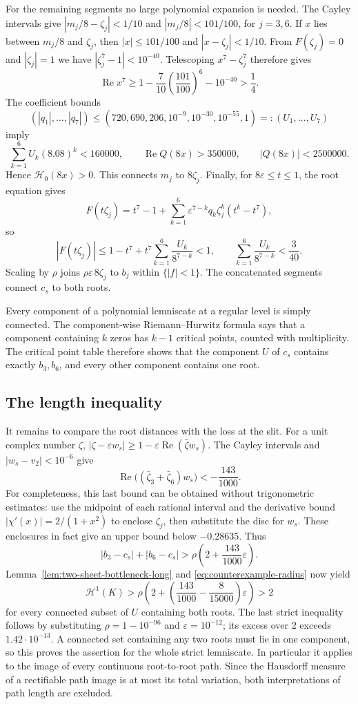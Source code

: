 For the remaining segments no large polynomial expansion is needed.
The Cayley intervals give
$|m_j/8-\zeta_j|<1/10$ and $|m_j/8|<101/100$, for $j=3,6$.
If $x$ lies between $m_j/8$ and $\zeta_j$, then
$|x|\le101/100$ and $|x-\zeta_j|<1/10$.
From $F(\zeta_j)=0$ and $|\zeta_j|=1$ we have
$|\zeta_j^7-1|<10^{-40}$. Telescoping $x^7-\zeta_j^7$ therefore gives
\[
 \operatorname{Re}x^7
 \ge1-\frac7{10}\left(\frac{101}{100}\right)^6-10^{-40}>\frac14.
\]
The coefficient bounds
\[
 (|q_1|,\ldots,|q_7|)
 \le(720,690,206,10^{-9},10^{-30},10^{-55},1)=:(U_1,\ldots,U_7)
\]
imply
\[
 \sum_{k=1}^6U_k(8.08)^k<160000,\qquad
 \operatorname{Re}Q(8x)>350000,\qquad |Q(8x)|<2500000.
\]
Hence $\mathscr H_0(8x)>0$. This connects $m_j$ to $8\zeta_j$.
Finally, for $8\varepsilon\le t\le1$, the root equation gives
\[
 F(t\zeta_j)=t^7-1+
       \sum_{k=1}^6\varepsilon^{7-k}q_k\zeta_j^k(t^k-t^7),
\]
so
\[
 |F(t\zeta_j)|\le1-t^7+t^7\sum_{k=1}^6\frac{U_k}{8^{7-k}}<1,
 \qquad \sum_{k=1}^6\frac{U_k}{8^{7-k}}<\frac{3}{40}.
\]
Scaling by $\rho$ joins $\rho\varepsilon\,8\zeta_j$ to $b_j$ within
$\{|f|<1\}$. The concatenated segments connect $c_s$ to both roots.

Every component of a polynomial lemniscate at a regular level is simply
connected. The component-wise Riemann--Hurwitz formula
\cite[proof of Proposition~2.1]{eks2010} says that a component containing
$k$ zeros has $k-1$ critical points, counted with multiplicity. The critical
point table therefore shows that the component $U$ of $c_s$ contains
exactly $b_3,b_6$, and every other component contains one root.

\subsection{The length inequality}\label{subsec:counterexample-length}

It remains to compare the root distances with the loss at the slit.
For a unit complex number $\zeta$,
$|\zeta-\varepsilon w_s|\ge1-\varepsilon\operatorname{Re}(\bar\zeta w_s)$.
The Cayley intervals and $|w_s-v_2|<10^{-6}$ give
\[
 \operatorname{Re}\bigl((\bar\zeta_3+\bar\zeta_6)w_s\bigr)
 <-\frac{143}{1000}.
\]
For completeness, this last bound can be obtained without trigonometric
estimates: use the midpoint of each rational interval and the derivative
bound $|\chi'(x)|=2/(1+x^2)$ to enclose $\zeta_j$, then substitute the
disc for $w_s$. These enclosures in fact give an upper bound below
$-0.28635$. Thus
\[
 |b_3-c_s|+|b_6-c_s|>\rho\left(2+\frac{143}{1000}\varepsilon\right).
\]
Lemma~\ref{lem:two-sheet-bottleneck-long} and
\eqref{eq:counterexample-radius} now yield
\[
 \mathcal H^1(K)>
 \rho\left(2+\left(\frac{143}{1000}-\frac8{15000}\right)
                     \varepsilon\right)>2
\]
for every connected subset of $U$ containing both roots. The last strict
inequality follows by substituting $\rho=1-10^{-96}$ and
$\varepsilon=10^{-12}$; its excess over $2$ exceeds $1.42\cdot10^{-13}$.
A connected set containing any two roots must lie in one component, so
this proves the assertion for the whole strict lemniscate. In particular
it applies to the image of every continuous root-to-root path. Since the
Hausdorff measure of a rectifiable path image is at most its total
variation, both interpretations of path length are excluded.

